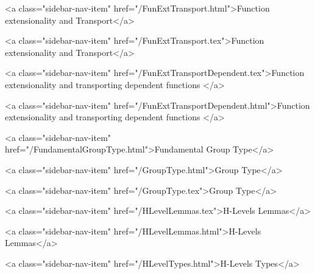       
    
      
        
          <a class="sidebar-nav-item" href="/FunExtTransport.html">Function extensionality and Transport</a>
        
      
    
      
        
          <a class="sidebar-nav-item" href="/FunExtTransport.tex">Function extensionality and Transport</a>
        
      
    
      
        
          <a class="sidebar-nav-item" href="/FunExtTransportDependent.tex">Function extensionality and transporting dependent functions </a>
        
      
    
      
        
          <a class="sidebar-nav-item" href="/FunExtTransportDependent.html">Function extensionality and transporting dependent functions </a>
        
      
    
      
        
          <a class="sidebar-nav-item" href="/FundamentalGroupType.html">Fundamental Group Type</a>
        
      
    
      
        
          <a class="sidebar-nav-item" href="/GroupType.html">Group Type</a>
        
      
    
      
        
          <a class="sidebar-nav-item" href="/GroupType.tex">Group Type</a>
        
      
    
      
        
          <a class="sidebar-nav-item" href="/HLevelLemmas.tex">H-Levels Lemmas</a>
        
      
    
      
        
          <a class="sidebar-nav-item" href="/HLevelLemmas.html">H-Levels Lemmas</a>
        
      
    
      
        
          <a class="sidebar-nav-item" href="/HLevelTypes.html">H-Levels Types</a>
        
      
    
